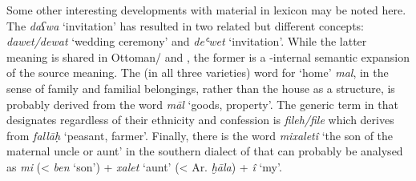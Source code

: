 \documentclass[output=paper]{langsci/langscibook}
\begin{document}
Some other interesting developments with  material in  lexicon may be noted here. The  \textit{daʕwa} ‘invitation’ has resulted in two related but different concepts: \textit{dawet/dewat} ‘wedding ceremony’ and \textit{deʿwet} ‘invitation’. While the latter meaning is shared in Ottoman/ and , the former is a -internal semantic expansion of the source meaning. The  (in all three varieties) word for ‘home’ \textit{mal}, in the sense of family and familial belongings, rather than the house as a structure, is probably derived from the  word \textit{māl} ‘goods, property’. The generic term in  that designates  regardless of their ethnicity and confession is \textit{fileh/file} which derives from  \textit{fallāḥ} ‘peasant, farmer’. Finally, there is the word \textit{mixaletî} ‘the son of the maternal uncle or aunt’ in the southern  dialect of   that can probably be analysed as \textit{mi} (< \textit{ben} ‘son’) + \textit{xalet} ‘aunt’ (< Ar. \textit{ḫāla}) + \textit{î} ‘my’.
\end{document}

